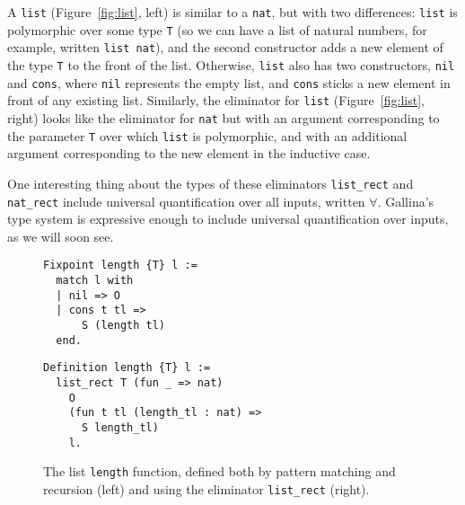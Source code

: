 A \lstinline{list} (Figure~\ref{fig:list}, left) is similar to a \lstinline{nat}, 
but with two differences: \lstinline{list} is polymorphic over some type \lstinline{T} (so we can have a list of natural numbers,
for example, written \lstinline{list nat}), and the second constructor adds a new element of the type \lstinline{T} to the front of the list.
Otherwise, \lstinline{list} also has two constructors, \lstinline{nil} and \lstinline{cons}, where \lstinline{nil} represents the empty list,
and \lstinline{cons} sticks a new element in front of any existing list.
Similarly, the eliminator for \lstinline{list} (Figure~\ref{fig:list}, right) looks like the eliminator for \lstinline{nat} 
but with an argument corresponding to the parameter \lstinline{T} over which \lstinline{list} is polymorphic,
and with an additional argument corresponding to the new element in the inductive case.

One interesting thing about the types of these eliminators \lstinline{list_rect} and \lstinline{nat_rect}
include universal quantification over all inputs, written $\forall$.
Gallina's type system is expressive enough to include universal quantification over inputs, as we will soon see.

\begin{figure}
\begin{minipage}{0.42\textwidth}
\begin{lstlisting}
Fixpoint length {T} l :=
  match l with
  | nil => O
  | cons t tl =>
      S (length tl)
  end.
\end{lstlisting}
\end{minipage}
\hfill
\begin{minipage}{0.54\textwidth}
\begin{lstlisting}
Definition length {T} l :=
  list_rect T (fun _ => nat)
    O
    (fun t tl (length_tl : nat) =>
      S length_tl)
    l.
\end{lstlisting}
\end{minipage}
\caption{The list \lstinline{length} function, defined both by pattern matching and recursion (left) and using the eliminator \lstinline{list_rect} (right).}
\label{fig:length}
\end{figure}

